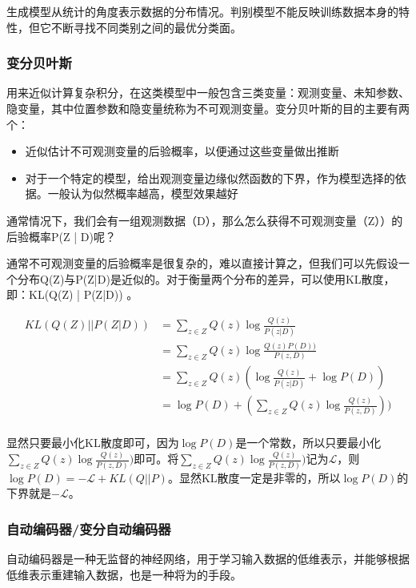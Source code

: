 生成模型从统计的角度表示数据的分布情况。判别模型不能反映训练数据本身的特性，但它不断寻找不同类别之间的最优分类面。

\subsubsection{变分贝叶斯}
用来近似计算复杂积分，在这类模型中一般包含三类变量：观测变量、未知参数、隐变量，其中位置参数和隐变量统称为不可观测变量。变分贝叶斯的目的主要有两个：
\begin{itemize}
	\item 近似估计不可观测变量的后验概率，以便通过这些变量做出推断
	\item 对于一个特定的模型，给出观测变量边缘似然函数的下界，作为模型选择的依据。一般认为似然概率越高，模型效果越好
\end{itemize}
通常情况下，我们会有一组观测数据（D），那么怎么获得不可观测变量（Z））的后验概率P(Z | D)呢？

通常不可观测变量的后验概率是很复杂的，难以直接计算之，但我们可以先假设一个分布Q(Z)与P(Z|D)是近似的。对于衡量两个分布的差异，可以使用KL散度，即：KL(Q(Z) | P(Z|D)) 。


\begin{equation}\nonumber
	\begin{aligned}
		KL(Q(Z) || P(Z|D)) &= \sum_{z \in Z} Q(z) \log \frac{Q(z)}{P(z|D)} \\
		
		&= \sum_{z \in Z} Q(z) \log \frac{Q(z) P(D) )}{P(z, D) } \\
		
		&= \sum_{z \in Z} Q(z) ( \log \frac{Q(z)}{P(z|D)} + \log P(D) ) \\
		
		&= \log P(D) + ( \sum_{z \in Z} Q(z) \log \frac{Q(z)}{P(z, D)}) ) \\
	\end{aligned}
\end{equation}


显然只要最小化KL散度即可，因为$\log P(D)$是一个常数，所以只要最小化$\sum_{z \in Z} Q(z) \log \frac{Q(z)}{P(z, D)})$即可。将$\sum_{z \in Z} Q(z) \log \frac{Q(z)}{P(z, D)})$记为$\mathcal{L}$，则$\log P(D) = -\mathcal{L} + KL(Q || P)$。显然KL散度一定是非零的，所以$\log P(D)$的下界就是$-\mathcal{L}$。


\subsubsection{自动编码器/变分自动编码器}
自动编码器是一种无监督的神经网络，用于学习输入数据的低维表示，并能够根据低维表示重建输入数据，也是一种将为的手段。

